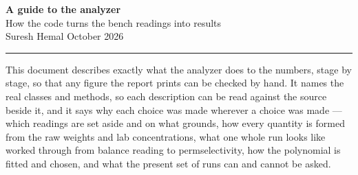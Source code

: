 \documentclass[11pt,a4paper]{article}
\begin{document}
\begin{center}
  {\large\bfseries A guide to the analyzer}\\[0.35em]
  {\normalsize How the code turns the bench readings into results}\\[0.9em]
  {\small Suresh Hemal \quad\textbullet{} October 2026}
\end{center}
\vspace{0.4em}
\hrule
\vspace{1.2em}

\tableofcontents
\vspace{1.2em}

This document describes exactly what the analyzer does to the numbers, stage by stage, so that
any figure the report prints can be checked by hand. It names the real classes and methods, so
each description can be read against the source beside it, and it says why each choice was made
wherever a choice was made --- which readings are set aside and on what grounds, how every
quantity is formed from the raw weights and lab concentrations, what one whole run looks like
worked through from balance reading to permselectivity, how the polynomial is fitted and chosen,
and what the present set of runs can and cannot be asked.







\end{document}
